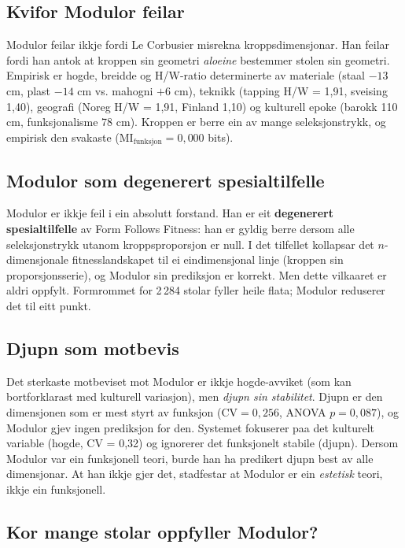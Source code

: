 \documentclass[10pt, a4paper, twocolumn]{article}
\begin{document}
\subsection{Kvifor Modulor feilar}

Modulor feilar ikkje fordi Le Corbusier misrekna kroppsdimensjonar. Han feilar fordi han antok at kroppen sin geometri \emph{aloeine} bestemmer stolen sin geometri. Empirisk er hogde, breidde og H/W-ratio determinerte av materiale (staal $-13$ cm, plast $-14$ cm vs. mahogni $+6$ cm), teknikk (tapping H/W = 1,91, sveising 1,40), geografi (Noreg H/W = 1,91, Finland 1,10) og kulturell epoke (barokk 110 cm, funksjonalisme 78 cm). Kroppen er berre ein av mange seleksjonstrykk, og empirisk den svakaste ($\text{MI}_{\text{funksjon}} = 0{,}000$ bits).

\subsection{Modulor som degenerert spesialtilfelle}

Modulor er ikkje feil i ein absolutt forstand. Han er eit \textbf{degenerert spesialtilfelle} av Form Follows Fitness: han er gyldig berre dersom alle seleksjonstrykk utanom kroppsproporsjon er null. I det tilfellet kollapsar det $n$-dimensjonale fitnesslandskapet til ei eindimensjonal linje (kroppen sin proporsjonsserie), og Modulor sin prediksjon er korrekt. Men dette vilkaaret er aldri oppfylt. Formrommet for 2\,284 stolar fyller heile flata; Modulor reduserer det til eitt punkt.

\subsection{Djupn som motbevis}

Det sterkaste motbeviset mot Modulor er ikkje hogde-avviket (som kan bortforklarast med kulturell variasjon), men \emph{djupn sin stabilitet}. Djupn er den dimensjonen som er mest styrt av funksjon ($\text{CV} = 0{,}256$, ANOVA $p = 0{,}087$), og Modulor gjev ingen prediksjon for den. Systemet fokuserer paa det kulturelt variable (hogde, CV = 0,32) og ignorerer det funksjonelt stabile (djupn). Dersom Modulor var ein funksjonell teori, burde han ha predikert djupn best av alle dimensjonar. At han ikkje gjer det, stadfestar at Modulor er ein \emph{estetisk} teori, ikkje ein funksjonell.

\subsection{Kor mange stolar oppfyller Modulor?}
\end{document}
